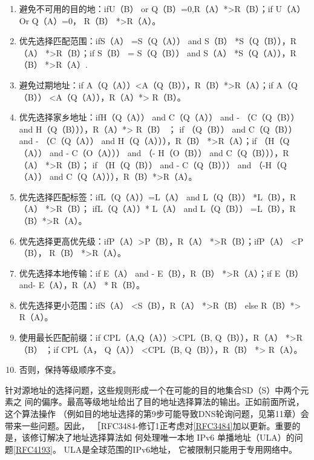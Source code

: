 \begin{enumerate}
  \item 避免不可用的目的地：ifU（B） or Q（B）=0,R（A）*>R（B）；if U（A） Or Q（A）=0，
    R（B） *>R（A）。

  \item 优先选择匹配范围：ifS（A） =S（Q（A）） and S（B） *S（Q（B）），R（A） *>R（B）；if
    S（B） = S（Q（B）） and S（A） *S（Q（A）），R（B） *>R（A）.

  \item 避免过期地址：if A（Q（A））<A（Q（B）），R（B）*>R（A）；if A（Q（B）） <A（Q（A）），R（A）*>
    R（B）。

  \item 优先选择家乡地址：ifH（Q（A）） and C（Q（A）） and - （C（Q（B）） and H（Q（B））），R（A）*>
    R（B） ； if （Q（B）） and C（Q（B）） and - （C（Q（A）） and H（Q（A））），R（B）
    *>R（A）；if （H（Q（A）） and -
    C（O（A））） and （- H（O（B）） and C（Q（B））），R（A） *>R（B）； if （H（Q（B）） and
    - C（Q（B））） and （-H（Q（A））
    and C（Q（A））），R（B）*>R（A）。

  \item 优先选择匹配标签：ifL（Q（A））=L（A） and L（Q（B）） *L（B），R（A） *>R（B）； ifL（Q（A））*
    L（A） and L（Q（B）） =L（B），R（B）*>R（A）。

  \item 优先选择更高优先级：ifP（A）>P（B），R（A） *>R（B）；ifP（A） <P（B）， R（B） *>R（A）。

  \item 优先选择本地传输：if E（A） and - E（B），R（B） *>R（A）；if E（B） and- E（A），R（A） *
    R（B）。

  \item 优先选择更小范围：ifS（A） <S（B），R（A） *>R（B） else R（B）*> R（A）。

  \item 使用最长匹配前缀：if CPL（A,Q（A））>CPL（B, Q（B）），R（A） *>R（B） ；if CPL（A，
    Q（A）） <CPL（B, Q（B）），R（B） *> R（A）。

  \item 否则，保持等级顺序不变。
\end{enumerate}

针对源地址的选择问题，这些规则形成一个在可能的目的地集合SD（S）中两个元素之
间的偏序。最高等级地址给出了目的地址选择算法的输出。正如前面所说，这个算法操作
（例如目的地址选择的第9步可能导致DNS轮询问题，见第11章）会带来一些问题。因此，
［RFC3484-修订1正考虑对\href{https://www.rfc-editor.org/rfc/rfc3484}{[RFC3484]}加以更新。重要的是，该修订解决了地址选择算法如
何处理唯一本地 IPv6
单播地址（ULA）的问题\href{https://www.rfc-editor.org/rfc/rfc4193}{[RFC4193]}。
ULA是全球范围的IPv6地址，
它被限制只能用于专用网络中。

